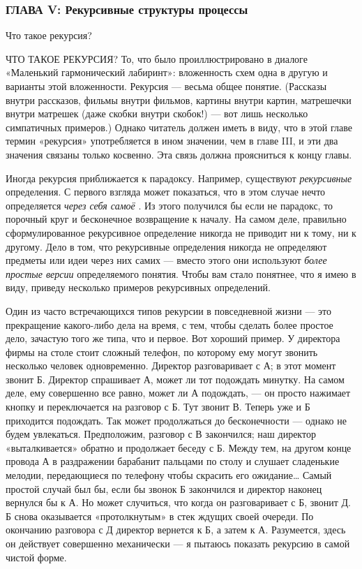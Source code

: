 \subsubsection{ГЛАВА V: Рекурсивные структуры  процессы}

Что такое рекурсия?

ЧТО ТАКОЕ РЕКУРСИЯ? То, что было проиллюстрировано в диалоге «Маленький гармонический лабиринт»: вложенность схем одна в другую и варианты этой вложенности. Рекурсия --- весьма общее понятие. (Рассказы внутри рассказов, фильмы внутри фильмов, картины внутри картин, матрешечки внутри матрешек (даже скобки внутри скобок!) --- вот лишь несколько симпатичных примеров.) Однако читатель должен иметь в виду, что в этой главе термин «рекурсия» употребляется в ином значении, чем в главе III, и эти два значения связаны только косвенно. Эта связь должна проясниться к концу главы.

Иногда рекурсия приближается к парадоксу. Например, существуют \emph{рекурсивные} определения. С первого взгляда может показаться, что в этом случае нечто определяется \emph{через себя самоё} . Из этого получился бы если не парадокс, то порочный круг и бесконечное возвращение к началу. На самом деле, правильно сформулированное рекурсивное определение никогда не приводит ни к тому, ни к другому. Дело в том, что рекурсивные определения никогда не определяют предметы или идеи через них самих --- вместо этого они используют \emph{более простые версии} определяемого понятия. Чтобы вам стало понятнее, что я имею в виду, приведу несколько примеров рекурсивных определений.

Один из часто встречающихся типов рекурсии в повседневной жизни --- это прекращение какого-либо дела на время, с тем, чтобы сделать более простое дело, зачастую того же типа, что и первое. Вот хороший пример. У директора фирмы на столе стоит сложный телефон, по которому ему могут звонить несколько человек одновременно. Директор разговаривает с А; в этот момент звонит Б. Директор спрашивает А, может ли тот подождать минутку. На самом деле, ему совершенно все равно, может ли А подождать, --- он просто нажимает кнопку и переключается на разговор с Б. Тут звонит В. Теперь уже и Б приходится подождать. Так может продолжаться до бесконечности --- однако не будем увлекаться. Предположим, разговор с В закончился; наш директор «выталкивается» обратно и продолжает беседу с Б. Между тем, на другом конце провода А в раздражении барабанит пальцами по столу и слушает сладенькие мелодии, передающиеся по телефону чтобы скрасить его ожидание\ldots{} Самый простой случай был бы, если бы звонок Б закончился и директор наконец вернулся бы к А. Но может случиться, что когда он разговаривает с Б, звонит Д. Б снова оказывается «протолкнутым» в стек ждущих своей очереди. По окончанию разговора с Д директор вернется к Б, а затем к А. Разумеется, здесь он действует совершенно механически --- я пытаюсь показать рекурсию в самой чистой форме.

